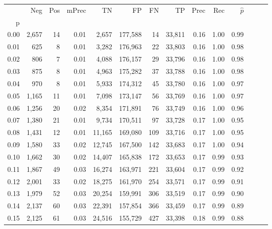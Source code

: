 \begin{tabular}{rrrrrrrrrrrrrr}
\toprule
{} &    Neg &  Pos & mPrec &       TN &       FP &      FN &      TP &  Prec &   Rec & $\hat{p}$ \\
p    &        &      &       &          &          &         &         &       &       &           \\
\midrule
0.00 &  2,657 &   14 &  0.01 &    2,657 &  177,588 &      14 &  33,811 &  0.16 &  1.00 &      0.99 \\
0.01 &    625 &    8 &  0.01 &    3,282 &  176,963 &      22 &  33,803 &  0.16 &  1.00 &      0.98 \\
0.02 &    806 &    7 &  0.01 &    4,088 &  176,157 &      29 &  33,796 &  0.16 &  1.00 &      0.98 \\
0.03 &    875 &    8 &  0.01 &    4,963 &  175,282 &      37 &  33,788 &  0.16 &  1.00 &      0.98 \\
0.04 &    970 &    8 &  0.01 &    5,933 &  174,312 &      45 &  33,780 &  0.16 &  1.00 &      0.97 \\
0.05 &  1,165 &   11 &  0.01 &    7,098 &  173,147 &      56 &  33,769 &  0.16 &  1.00 &      0.97 \\
0.06 &  1,256 &   20 &  0.02 &    8,354 &  171,891 &      76 &  33,749 &  0.16 &  1.00 &      0.96 \\
0.07 &  1,380 &   21 &  0.01 &    9,734 &  170,511 &      97 &  33,728 &  0.17 &  1.00 &      0.95 \\
0.08 &  1,431 &   12 &  0.01 &   11,165 &  169,080 &     109 &  33,716 &  0.17 &  1.00 &      0.95 \\
0.09 &  1,580 &   33 &  0.02 &   12,745 &  167,500 &     142 &  33,683 &  0.17 &  1.00 &      0.94 \\
0.10 &  1,662 &   30 &  0.02 &   14,407 &  165,838 &     172 &  33,653 &  0.17 &  0.99 &      0.93 \\
0.11 &  1,867 &   49 &  0.03 &   16,274 &  163,971 &     221 &  33,604 &  0.17 &  0.99 &      0.92 \\
0.12 &  2,001 &   33 &  0.02 &   18,275 &  161,970 &     254 &  33,571 &  0.17 &  0.99 &      0.91 \\
0.13 &  1,979 &   52 &  0.03 &   20,254 &  159,991 &     306 &  33,519 &  0.17 &  0.99 &      0.90 \\
0.14 &  2,137 &   60 &  0.03 &   22,391 &  157,854 &     366 &  33,459 &  0.17 &  0.99 &      0.89 \\
0.15 &  2,125 &   61 &  0.03 &   24,516 &  155,729 &     427 &  33,398 &  0.18 &  0.99 &      0.88 \\

\end{tabular}
